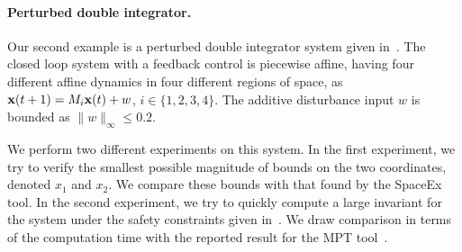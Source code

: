 \vspace{-1em}
\paragraph{Perturbed double integrator.}
Our second example is a perturbed double integrator system given
in~\cite{rakovic2004computation}.  The closed loop system with a
feedback control is piecewise affine, having four different affine
dynamics in four different regions of space, as
${\bf x}(t+1)=M_i{\bf x}(t)+w$, $i\in\{1,2,3,4\}$.  %
%
The additive disturbance input $w$ is bounded as $\|w\|_{\infty}\leq
0.2$.  

We perform two different experiments on this system.  In the first
experiment, we try to verify the smallest possible magnitude of bounds
on the two coordinates, denoted $x_1$ and $x_2$. We compare these
bounds with that found by the SpaceEx tool.  In the second experiment,
we try to quickly compute a large invariant for the system under the
safety constraints given in~\cite{rakovic2004computation}.  %
We draw comparison in terms of the computation time with
the reported result for the MPT tool~\cite{rakovic2004computation}.

